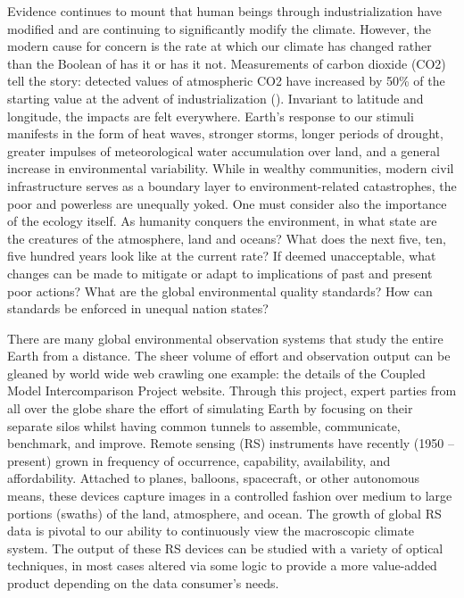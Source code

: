 \begin{refsection}
Evidence continues to mount that human beings through industrialization have modified and are continuing to significantly modify the climate. However, the modern cause for concern is the rate at which our climate has changed rather than the Boolean of has it or has it not. Measurements of carbon dioxide (CO2) tell the story: detected values of atmospheric CO2 have increased by 50\% of the starting value at the advent of industrialization (\cite{eldering2017orbiting}). Invariant to latitude and longitude, the impacts are felt everywhere. Earth’s response to our stimuli manifests in the form of heat waves, stronger storms, longer periods of drought, greater impulses of meteorological water accumulation over land, and a general increase in environmental variability. While in wealthy communities, modern civil infrastructure serves as a boundary layer to environment-related catastrophes, the poor and powerless are unequally yoked. One must consider also the importance of the ecology itself. As humanity conquers the environment, in what state are the creatures of the atmosphere, land and oceans? What does the next five, ten, five hundred years look like at the current rate? If deemed unacceptable, what changes can be made to mitigate or adapt to implications of past and present poor actions? What are the global environmental quality standards? How can standards be enforced in unequal nation states? 

There are many global environmental observation systems that study the entire Earth from a distance. The sheer volume of effort and observation output can be gleaned by world wide web crawling one example: the details of the Coupled Model Intercomparison Project website. Through this project, expert parties from all over the globe share the effort of simulating Earth by focusing on their separate silos whilst having common tunnels to assemble, communicate, benchmark, and improve. Remote sensing (RS) instruments have recently (1950 – present) grown in frequency of occurrence, capability, availability, and affordability. Attached to planes, balloons, spacecraft, or other autonomous means, these devices capture images in a controlled fashion over medium to large portions (swaths) of the land, atmosphere, and ocean. The growth of global RS data is pivotal to our ability to continuously view the macroscopic climate system. The output of these RS devices can be studied with a variety of optical techniques, in most cases altered via some logic to provide a more value-added product depending on the data consumer’s needs.  


\end{refsection}

